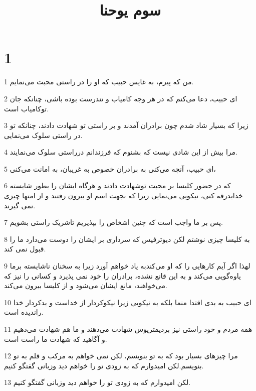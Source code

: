 

\title{سوم يوحنا}


\chapter{1}

\par 1 من که پیرم، به غایس حبیب که او را در راستی محبت می‌نمایم.
\par 2 ‌ای حبیب، دعا می‌کنم که در هر وجه کامیاب و تندرست بوده باشی، چنانکه جان توکامیاب است.
\par 3 زیرا که بسیار شاد شدم چون برادران آمدند و بر راستی تو شهادت دادند، چنانکه تو در راستی سلوک می‌نمایی.
\par 4 مرا بیش از این شادی نیست که بشنوم که فرزندانم درراستی سلوک می‌نمایند.
\par 5 ‌ای حبیب، آنچه می‌کنی به برادران خصوص به غریبان، به امانت می‌کنی،
\par 6 که در حضور کلیسا بر محبت توشهادت دادند و هرگاه ایشان را بطور شایسته خدابدرقه کنی، نیکویی می‌نمایی زیرا که بجهت اسم او بیرون رفتند و از امتها چیزی نمی گیرند.
\par 7 پس بر ما واجب است که چنین اشخاص را بپذیریم تاشریک راستی بشویم.
\par 8 به کلیسا چیزی نوشتم لکن دیوترفیس که سرداری بر ایشان را دوست می‌دارد ما را قبول نمی کند.
\par 9 لهذا اگر آیم کارهایی را که او می‌کندبه یاد خواهم آورد زیرا به سخنان ناشایسته برما یاوه‌گویی می‌کند و به این قانع نشده، برادران را خود نمی پذیرد و کسانی را نیز که می‌خواهند، مانع ایشان می‌شود و از کلیسا بیرون می‌کند.
\par 10 ‌ای حبیب به بدی اقتدا منما بلکه به نیکویی زیرا نیکو‌کردار از خداست و بدکردار خدا راندیده است.
\par 11 همه مردم و خود راستی نیز بردیمتریوس شهادت می‌دهند و ما هم شهادت می‌دهیم و آگاهید که شهادت ما راست است.
\par 12 مرا چیزهای بسیار بود که به تو بنویسم، لکن نمی خواهم به مرکب و قلم به تو بنویسم.لکن امیدوارم که به زودی تو را خواهم دید وزبانی گفتگو کنیم.
\par 13 لکن امیدوارم که به زودی تو را خواهم دید وزبانی گفتگو کنیم.



